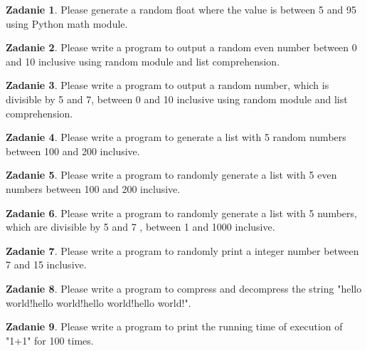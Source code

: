 \documentclass[11pt]{article}
\theoremstyle{definition}
\newtheorem{zadanie}{Zadanie}
\begin{document}
\begin{zadanie}
Please generate a random float where the value is between 5 and 95 using Python math module.

\end{zadanie}

\begin{zadanie}
Please write a program to output a random even number between 0 and 10 inclusive using random module and list comprehension.

\end{zadanie}

\begin{zadanie}
Please write a program to output a random number, which is divisible by 5 and 7, between 0 and 10 inclusive using random module and list comprehension.

\end{zadanie}

\begin{zadanie}
Please write a program to generate a list with 5 random numbers between 100 and 200 inclusive.

\end{zadanie}

\begin{zadanie}
Please write a program to randomly generate a list with 5 even numbers between 100 and 200 inclusive.

\end{zadanie}

\begin{zadanie}
Please write a program to randomly generate a list with 5 numbers, which are divisible by 5 and 7 , between 1 and 1000 inclusive.

\end{zadanie}

\begin{zadanie}
Please write a program to randomly print a integer number between 7 and 15 inclusive.

\end{zadanie}

\begin{zadanie}
Please write a program to compress and decompress the string "hello world!hello world!hello world!hello world!".

\end{zadanie}

\begin{zadanie}
Please write a program to print the running time of execution of "1+1" for 100 times.

\end{zadanie}
\end{document}
